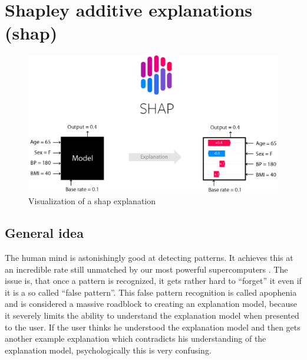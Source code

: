 
\chapter{Shapley additive explanations (shap)}
\label{chap:SHAP}

\begin{figure}[H]
    \centering
    \includegraphics[width=\linewidth]{images/04_shap/ShapExplanationVisualized.png}
    \caption{Visualization of a shap explanation \cite{shapDocs}}
    \label{fig:shap_visualization}
\end{figure}


\section{General idea}

The human mind is astonishingly good at detecting patterns. It achieves this at an incredible rate still unmatched by our most powerful supercomputers \cite{patternRecognitionPsychology}. The issue is, that once a pattern is recognized, it gets rather hard to \enquote{forget} it even if it is a so called \enquote{false pattern}. This false pattern recognition is called apophenia and is considered a massive roadblock to creating an explanation model, because it severely limits the ability to understand the explanation model when presented to the user. If the user thinks he understood the explanation model and then gets another example explanation which contradicts his understanding of the explanation model, psychologically this is very confusing. 


